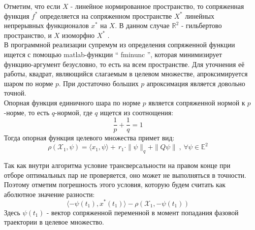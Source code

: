 \documentclass[10pt]{article}
\begin{document}
Отметим, что если \( X \) - линейное нормированное пространство, то сопряженная функция \( f^{*} \) определяется на сопряженном пространстве \( X^{*} \) линейных непрерывных функционалов \( x^{*} \) на \( X \). В данном случае \( \mathbb{R}^2 \) - гильбертово пространство, и \( X \) изоморфно \( X^{*} \) .\smallskip\\
В программной реализации супремум из определения сопряженной функции ищется с помощью matlab-функции `` fminunc '', которая минимизирует функцию-аргумент безусловно, то есть на всем пространстве. Для уточнения её работы, квадрат, являющийся слагаемым в целевом множестве, апроксимируется шаром по норме \( p \). При достаточно больших \( p \) апроксимация является довольно точной.\smallskip\\
Опорная функция единичного шара по норме \( p \) является сопряженной нормой к \(p\)-норме, то есть \(q\)-нормой, где \(q \) ищется из соотнощения:
\[ \frac{1}{p} + \frac{1}{q} = 1 \]
Тогда опорная функция целевого множества примет вид:
\[ \rho(\mathcal{X}_1, \psi) =  \langle x_1, \psi \rangle + \, r_1 \cdot \|\psi\|_q + \|Q\psi\| \ , \ \forall \psi \in \mathbb{E}^2\]

Так как внутри алгоритма условие трансверсальности на правом конце при отборе оптимальных пар не проверяется, оно может не выполняться в точности. Поэтому отметим погрешность этого условия, которую будем считать как аболютное значение разности:
\[ \langle -\psi(t_1), x^*(t_1) \rangle - \rho(\mathcal{X}_1 , -\psi(t_1)) \]
Здесь \( \psi(t_1) \) - вектор сопряженной переменной в момент попадания фазовой траектории в целевое множество.
\end{document}

